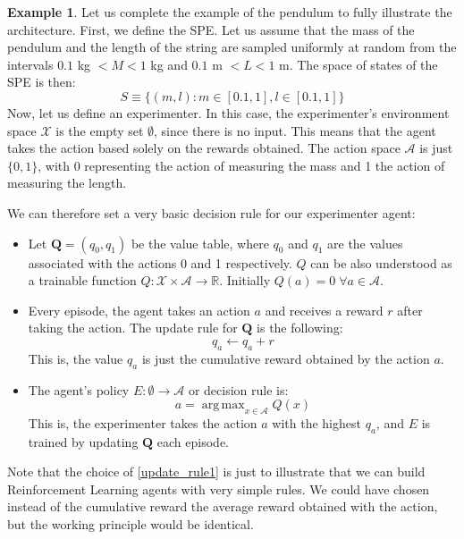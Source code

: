 \documentclass[11pt,a4paper,twoside]{report}
\DeclareMathOperator*{\argmax}{arg\,max}
\newcommand{\+}{\textnormal{+} }
\theoremstyle{definition}
\newtheorem{myex}[mythm]{Example}
\numberwithin{equation}{chapter}
\begin{document}
\begin{myex}
Let us complete the example of the pendulum to fully illustrate the architecture.
First, we define the SPE. Let us assume that the mass of the pendulum and the
length of the string are sampled uniformly at random from the intervals \break
$0.1$ kg $< M < 1$ kg and $ 0.1$ m $<L<1 $ m. The space of states of the SPE
is then:
 \begin{equation}
  S\equiv \{(m,l):m \in \left[0.1, 1\right],l \in [0.1,1]\}
 \end{equation}
Now, let us define an experimenter. In this case, the experimenter's environment
space $\mathcal{X}$ is the empty set $\emptyset$, since there is no input. This
means that the agent takes the action based solely on the rewards obtained. The
action space $\mathcal{A}$ is just $\{0,1\}$, with 0 representing the action of
measuring the mass and 1 the action of measuring the length.

We can therefore set a very basic decision rule for our experimenter agent:

\begin{itemize}
  \item Let $\textbf{Q}=(q_0,q_1)$ be the value table, where $q_0$ and $q_1$ are
  the values associated with the actions 0 and 1 respectively.  $Q$ can be also
  understood as a trainable function $Q:\mathcal{X}\times\mathcal{A} \rightarrow
  \mathbb{R}$. Initially $Q(a)=0 \; \forall a \in \mathcal{A}$. 
  \item  Every episode, the agent takes an action $a$ and receives a reward $r$
  after taking the action.
  The update rule for $\textbf{Q}$ is the following:
  \begin{equation}
    q_a\leftarrow q_a + r
    \label{update_rule1}
  \end{equation}
  This is, the value $q_a$ is just the cumulative reward obtained by the 
  action $a$. 
  \item The agent's policy $E:\emptyset  \rightarrow \mathcal{A}$ or 
  decision rule is:
  \begin{equation}
    a = \argmax_{x \in \mathcal{A}} Q(x)
    \label{argmax_policy}
  \end{equation}
  This is, the experimenter takes the action $a$ with the highest $q_a$, and 
  $E$ is trained by updating $\textbf{Q}$ each episode.
\end{itemize}

Note that the choice of \eqref{update_rule1} is just to illustrate that we can
build Reinforcement Learning agents with very simple rules. We could have
chosen instead of the cumulative reward the average reward obtained with the 
action, but the working principle would be identical.


\end{myex}
\end{document}

